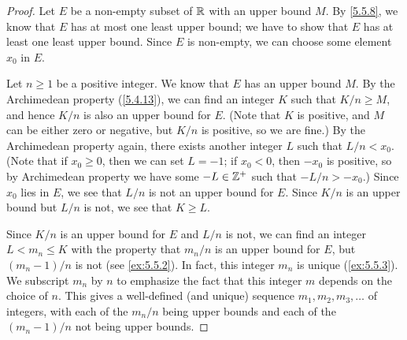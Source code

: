 \begin{proof}
  Let \(E\) be a non-empty subset of \(\mathbb{R}\) with an upper bound \(M\).
  By \cref{5.5.8}, we know that \(E\) has at most one least upper bound;
  we have to show that \(E\) has at least one least upper bound.
  Since \(E\) is non-empty, we can choose some element \(x_0\) in \(E\).

  Let \(n \geq 1\) be a positive integer.
  We know that \(E\) has an upper bound \(M\).
  By the Archimedean property (\cref{5.4.13}), we can find an integer \(K\) such that \(K / n \geq M\), and hence \(K / n\) is also an upper bound for \(E\).
  (Note that \(K\) is positive, and \(M\) can be either zero or negative, but \(K / n\) is positive, so we are fine.)
  By the Archimedean property again, there exists another integer \(L\) such that \(L / n < x_0\).
  (Note that if \(x_0 \geq 0\), then we can set \(L = -1\); if \(x_0 < 0\), then \(-x_0\) is positive, so by Archimedean property we have some \(-L \in \mathbb{Z}^+\) such that \(-L / n > -x_0\).)
  Since \(x_0\) lies in \(E\), we see that \(L / n\) is not an upper bound for \(E\).
  Since \(K / n\) is an upper bound but \(L / n\) is not, we see that \(K \geq L\).

  Since \(K / n\) is an upper bound for \(E\) and \(L / n\) is not, we can find an integer \(L < m_n \leq K\) with the property that \(m_n / n\) is an upper bound for \(E\), but \((m_n - 1) / n\) is not (see \cref{ex:5.5.2}).
  In fact, this integer \(m_n\) is unique (\cref{ex:5.5.3}).
  We subscript \(m_n\) by \(n\) to emphasize the fact that this integer \(m\) depends on the choice of \(n\).
  This gives a well-defined (and unique) sequence \(m_1, m_2, m_3, \dots\) of integers, with each of the \(m_n / n\) being upper bounds and each of the \((m_n - 1) / n\) not being upper bounds.


\end{proof}
